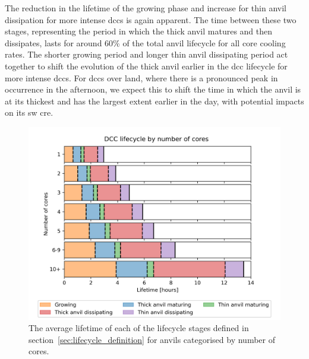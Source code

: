 The reduction in the lifetime of the growing phase and increase for thin anvil dissipation for more intense \acrshort{dcc}s is again apparent.
The time between these two stages, representing the period in which the thick anvil matures and then dissipates, lasts for around 60\% of the total anvil lifecycle for all core cooling rates.
The shorter growing period and longer thin anvil dissipating period act together to shift the evolution of the thick anvil earlier in the \acrshort{dcc} lifecycle for more intense \acrshort{dcc}s.
For \acrshort{dcc}s over land, where there is a pronounced peak in occurrence in the afternoon, we expect this to shift the time in which the anvil is at its thickest and has the largest extent earlier in the day, with potential impacts on its \acrshort{sw} \acrshort{cre}.



\begin{figure}[tp]
    \centering
    \includegraphics[width=\textwidth]{figures/chapter3_11.png}
    \caption[
    The average lifetime of each lifecycle stage for anvils categorised by number of cores
    ]{
    The average lifetime of each of the lifecycle stages defined in section~\ref{sec:lifecycle_definition} for anvils categorised by number of cores.
    }
    \label{fig:anvil_number_of_cores_absolute_lifecycle}
\end{figure}


